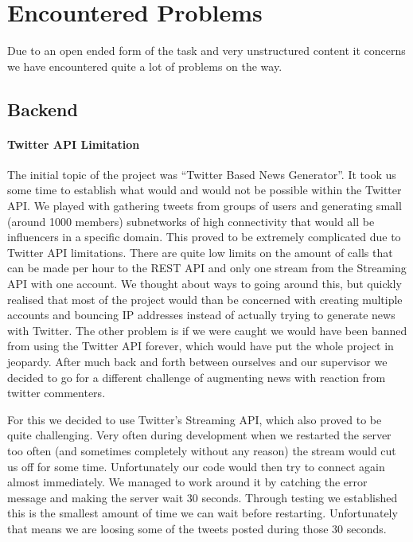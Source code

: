 \documentclass{report}
\begin{document}
	
	  \section{Encountered Problems}
	  Due to an open ended form of the task and very unstructured content it concerns we have encountered quite a lot of problems on the way.
	  
	  \subsection{Backend}
	  
	  \paragraph{Twitter API Limitation} The initial topic of the project was ``Twitter Based News Generator''. It took us some time to establish what would and would not be possible within the Twitter API. We played with gathering tweets from groups of users and generating small (around 1000 members) subnetworks of high connectivity that would all be influencers in a specific domain. This proved to be extremely complicated due to Twitter API limitations. There are quite low limits on the amount of calls that can be made per hour to the REST API and only one stream from the Streaming API with one account. We thought about ways to going around this, but quickly realised that most of the project would than be concerned with creating multiple accounts and bouncing IP addresses instead of actually trying to generate news with Twitter. The other problem is if we were caught we would have been banned from using the Twitter API forever, which would have put the whole project in jeopardy. After much back and forth between ourselves and our supervisor we decided to go for a different challenge of augmenting news with reaction from twitter commenters.
	  
	  For this we decided to use Twitter's Streaming API, which also proved to be quite challenging. Very often during development when we restarted the server too often (and sometimes completely without any reason) the stream would cut us off for some time. Unfortunately our code would then try to connect again almost immediately. We managed to work around it by catching the error message and making the server wait 30 seconds. Through testing we established this is the smallest amount of time we can wait before restarting. Unfortunately that means we are loosing some of the tweets posted during those 30 seconds.
	  
\end{document}
